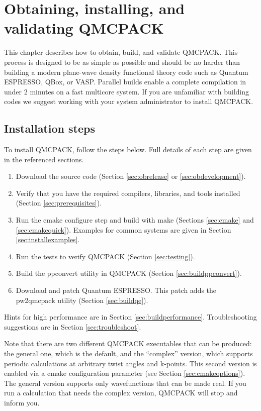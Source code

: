 \chapter{Obtaining, installing, and validating QMCPACK}
\label{chap:obtaininginstalling}

This chapter describes how to obtain, build, and validate QMCPACK. This process is designed to be as simple as
possible and should be no harder than building a modern plane-wave density
functional theory code such as Quantum ESPRESSO, QBox, or
VASP. Parallel builds enable a complete
compilation in under 2 minutes on a fast multicore system. If you
are unfamiliar with building codes we suggest working with your system
administrator to install QMCPACK.

\section{Installation steps}
To install QMCPACK, follow the steps below. Full details of
each step are given in the referenced sections.
\begin{enumerate}
\item Download the source code (Section \ref{sec:obrelease} or \ref{sec:obdevelopment}).
\item Verify that you have the required compilers, libraries, and tools
  installed (Section \ref{sec:prerequisites}).
\item Run the cmake configure step and build with make (Sections
  \ref{sec:cmake} and \ref{sec:cmakequick}). Examples for common
  systems are given in Section \ref{sec:installexamples}.
\item Run the tests to verify QMCPACK (Section \ref{sec:testing}).
\item Build the ppconvert utility in QMCPACK (Section \ref{sec:buildppconvert}).
\item Download and patch Quantum ESPRESSO. This patch adds the
  pw2qmcpack utility (Section \ref{sec:buildqe}).
\end{enumerate}

Hints for high performance are in Section \ref{sec:buildperformance}. Troubleshooting suggestions are in Section \ref{sec:troubleshoot}.

Note that there are two different QMCPACK executables that can be
produced: the general one, which is the default, and the ``complex''
version, which supports periodic calculations at arbitrary twist angles and
k-points. This second version is enabled via a cmake configuration
parameter (see Section \ref{sec:cmakeoptions}). The general version
 supports only wavefunctions that can be made real. If you run a
calculation that needs the complex version, QMCPACK will stop and inform you.

